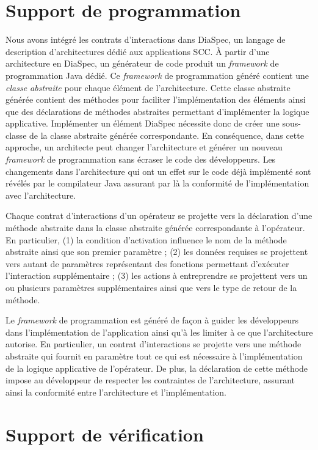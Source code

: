 \documentclass{llncs}
\begin{document}
\section{Support de programmation}
\label{sec:implementation}

Nous avons intégré les contrats d'interactions dans DiaSpec, un
langage de description d'architectures dédié aux applications SCC. À
partir d'une architecture en DiaSpec, un générateur de code produit un
\emph{framework} de programmation Java dédié.
Ce \emph{framework} de programmation généré contient une \emph{classe
  abstraite} pour chaque élément de l'architecture. Cette classe
abstraite générée contient des méthodes pour faciliter
l'implémentation des éléments ainsi que des déclarations de méthodes
abstraites permettant d'implémenter la logique applicative.
Implémenter un élément DiaSpec nécessite donc de créer une sous-classe
de la classe abstraite générée correspondante. En conséquence, dans
cette approche, un architecte peut changer l'architecture et générer
un nouveau \emph{framework} de programmation sans écraser le code des
développeurs. Les changements dans l'architecture qui ont un effet sur
le code déjà implémenté sont révélés par le compilateur Java assurant
par là la conformité de l'implémentation avec l'architecture.

Chaque contrat d'interactions d'un opérateur se projette vers la
déclaration d'une méthode abstraite dans la classe abstraite générée
correspondante à l'opérateur. En particulier, (1) la condition
d'activation influence le nom de la méthode abstraite ainsi que son
premier paramètre ; (2) les données requises se projettent vers
autant de paramètres représentant des fonctions permettant d'exécuter
l'interaction supplémentaire ; (3) les actions à entreprendre se
projettent vers un ou plusieurs paramètres supplémentaires ainsi que
vers le type de retour de la méthode.

Le \emph{framework} de programmation est généré de façon à guider les
développeurs dans l'implémentation de l'application ainsi qu'à les
limiter à ce que l'architecture autorise. En particulier, un contrat
d'interactions se projette vers une méthode abstraite qui fournit en
paramètre tout ce qui est nécessaire à l'implémentation de la logique
applicative de l'opérateur. De plus, la déclaration de cette méthode
impose au développeur de respecter les contraintes de l'architecture,
assurant ainsi la conformité entre l'architecture et l'implémentation.

\section{Support de vérification}
\label{sec:analyses}
\end{document}
